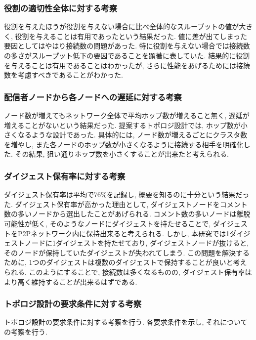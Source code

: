 \subsubsection{役割の適切性全体に対する考察}
役割を与えたほうが役割を与えない場合に比べ全体的なスループットの値が大きく, 役割を与えることは有用であったという結果だった. 値に差が出てしまった要因としてはやはり接続数の問題があった. 特に役割を与えない場合では接続数の多さがスループット低下の要因であることを顕著に表していた. 結果的に役割を与えることは有用であることはわかったが, さらに性能をあげるためには接続数を考慮すべきであることがわかった.

\subsubsection{配信者ノードから各ノードへの遅延に対する考察}
ノード数が増えてもネットワーク全体で平均ホップ数が増えること無く, 遅延が増えることがないという結果だった. 提案するトポロジ設計では, ホップ数が小さくなるような設計であった. 具体的には, ノード数が増えるごとにクラスタ数を増やし, また各ノードのホップ数が小さくなるように接続する相手を明確化した. その結果, 狙い通りホップ数を小さくすることが出来たと考えられる.

\subsubsection{ダイジェスト保有率に対する考察}
ダイジェスト保有率は平均で76\%を記録し, 概要を知るのに十分という結果だった. ダイジェスト保有率が高かった理由として, ダイジェストノードをコメント数の多いノードから選出したことがあげられる. コメント数の多いノードは離脱可能性が低く, そのようなノードにダイジェストを持たせることで, ダイジェストをP2Pネットワーク内に保持出来ると考えられる. しかし, 本研究では1ダイジェストノードに1ダイジェストを持たせており, ダイジェストノードが抜けると, そのノードが保持していたダイジェストが失われてしまう. この問題を解決するために, 1つのダイジェストは複数のダイジェストで保持することが良いと考えられる. このようにすることで, 接続数は多くなるものの, ダイジェスト保有率はより高く維持することが出来るはずである.

\subsubsection{トポロジ設計の要求条件に対する考察}
トポロジ設計の要求条件に対する考察を行う. 各要求条件を示し, それについての考察を行う.

